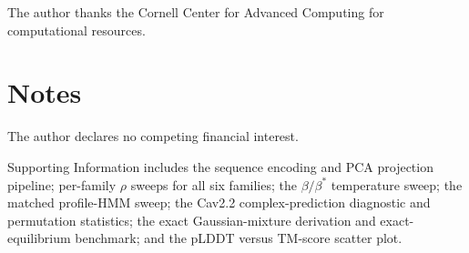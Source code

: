 \documentclass[journal=jcisd8,manuscript=article,keywords=true]{achemso}
\theoremstyle{definition}
\theoremstyle{remark}
\begin{document}
\begin{acknowledgement}
The author thanks the Cornell Center for Advanced Computing for computational resources.
\end{acknowledgement}

\section*{Notes}
The author declares no competing financial interest.



\begin{suppinfo}

Supporting Information includes the sequence encoding and PCA projection
pipeline; per-family $\rho$ sweeps for all six families; the
$\beta/\beta^{*}$ temperature sweep; the matched profile-HMM sweep; the Cav2.2
complex-prediction diagnostic and permutation statistics; the exact
Gaussian-mixture derivation and exact-equilibrium benchmark; and the pLDDT versus
TM-score scatter plot.

\end{suppinfo}
\end{document}
